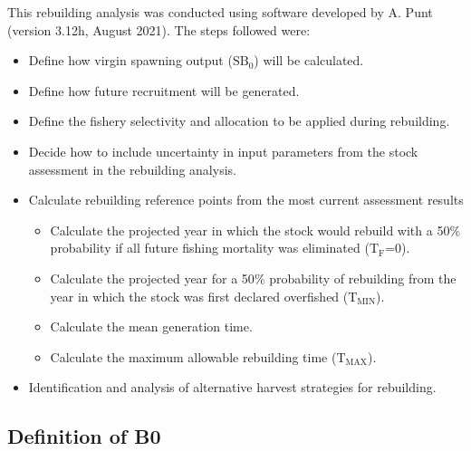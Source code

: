 \documentclass[11pt,
  english,
  a4paper,
]{article}
\begin{document}
\leavevmode\tagmcend\tagstructend


This rebuilding analysis was conducted using software developed by A. Punt (version 3.12h, August 2021). The steps followed were:

\leavevmode\tagmcend\tagstructend\par

\begin{itemize}
    \item Define how virgin spawning output ($\text{SB}_0$) will be calculated. 
    \item Define how future recruitment will be generated. 
    \item Define the fishery selectivity and allocation to be applied during rebuilding. 
    \item Decide how to include uncertainty in input parameters from the stock assessment in the rebuilding analysis. 
    \item Calculate rebuilding reference points from the most current assessment results 
    \begin{itemize}
        \item Calculate the projected year in which the stock would rebuild with a 50$\%$ probability if all future fishing mortality was eliminated ($\text{T}_\text{F}$=0).
        \item  Calculate the projected year for a 50$\%$ probability of rebuilding from the year in which the stock was first declared overfished ($\text{T}_\text{MIN}$). 
        \item Calculate the mean generation time. 
        \item Calculate the maximum allowable rebuilding time ($\text{T}_\text{MAX}$). 
    \end{itemize}
    \item Identification and analysis of alternative harvest strategies for rebuilding. 
\end{itemize}


\hypertarget{definition-of-b0}{%
\subsection{Definition of B0}\label{definition-of-b0}}

\leavevmode\tagmcend\tagstructend

\end{document}
